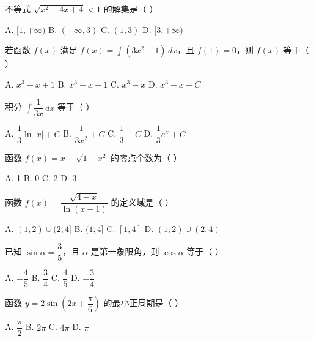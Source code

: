 \documentclass[11pt, a4paper]{article}
\begin{document}
\begin{baitap}[7]
不等式 $\sqrt{x^2 - 4x + 4} < 1$ 的解集是（ ）
\par\vspace{3pt}
\noindent A. $[1, +\infty)$ \quad B. $(-\infty, 3)$ \quad C. $(1, 3)$ \quad D. $[3, +\infty)$
\end{baitap}

\begin{baitap}[8]
若函数 $f(x)$ 满足 $f(x) = \displaystyle\int (3x^2 - 1)\,dx$，且 $f(1) = 0$，则 $f(x)$ 等于（ ）
\par\vspace{3pt}
\noindent A. $x^3 - x + 1$ \quad B. $x^3 - x - 1$ \quad C. $x^3 - x$ \quad D. $x^3 - x + C$
\end{baitap}

\begin{baitap}[9]
积分 $\displaystyle\int \dfrac{1}{3x}\,dx$ 等于（ ）
\par\vspace{3pt}
\noindent A. $\dfrac{1}{3}\ln\lvert x \rvert + C$ \quad B. $\dfrac{1}{3x^2} + C$ \quad C. $\dfrac{1}{3} + C$ \quad D. $\dfrac{1}{3}e^x + C$
\end{baitap}

\begin{baitap}[10]
函数 $f(x) = x - \sqrt{1 - x^2}$ 的零点个数为（ ）
\par\vspace{3pt}
\noindent A. 1 \quad B. 0 \quad C. 2 \quad D. 3
\end{baitap}

\begin{baitap}[11]
函数 $f(x) = \dfrac{\sqrt{4 - x}}{\ln(x - 1)}$ 的定义域是（ ）
\par\vspace{3pt}
\noindent A. $(1, 2) \cup (2, 4]$ \quad B. $(1, 4]$ \quad C. $[1, 4]$ \quad D. $(1, 2) \cup (2, 4)$
\end{baitap}

\begin{baitap}[12]
已知 $\sin\alpha = \dfrac{3}{5}$，且 $\alpha$ 是第一象限角，则 $\cos\alpha$ 等于（ ）
\par\vspace{3pt}
\noindent A. $-\dfrac{4}{5}$ \quad B. $\dfrac{3}{4}$ \quad C. $\dfrac{4}{5}$ \quad D. $-\dfrac{3}{4}$
\end{baitap}

\begin{baitap}[13]
函数 $y = 2\sin\left( 2x + \dfrac{\pi}{6} \right)$ 的最小正周期是（ ）
\par\vspace{3pt}
\noindent A. $\dfrac{\pi}{2}$ \quad B. $2\pi$ \quad C. $4\pi$ \quad D. $\pi$
\end{baitap}
\end{document}

